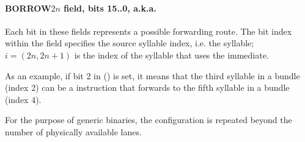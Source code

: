 \paragraph*{BORROW$2n$ field, bits 15..0, a.k.a. }
Each bit in these fields represents a possible  forwarding route.
The bit index within the field specifies the source syllable index, i.e. the
 syllable; $i = \left ( 2n, 2n+1 \right )$ is the index of the
syllable that uses the immediate.

As an example, if bit 2 in  () is set, it means that
the third syllable in a bundle (index 2) can be a  instruction that
forwards to the fifth syllable in a bundle (index 4).

For the purpose of generic binaries, the configuration is repeated beyond the
number of physically available lanes.
